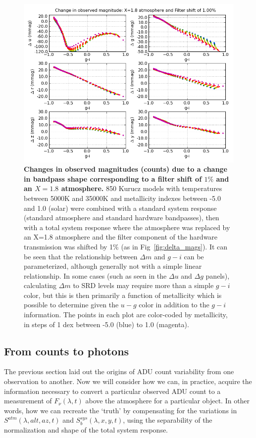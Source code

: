 \documentclass[12pt,preprint]{aastex}
\begin{document}
\begin{figure}[htbp]
\includegraphics[width=6in]{delta_mags2}
\caption{ {\small {\bf Changes in observed magnitudes (counts) due to
a change in bandpass shape corresponding to a filter shift of $1\%$
and an $X=1.8$ atmosphere.} 850 Kurucz models with temperatures
between 5000K and 35000K and metallicity indexes between -5.0 and 1.0
(solar) were combined with a standard system response (standard
atmosphere and standard hardware bandpasses), then with a total system
response where the atmosphere was replaced by an X=1.8 atmosphere and
the filter component of the hardware transmission was shifted by 1\%
(as in Fig~\ref{fig:delta_mags}).  It can be seen that the
relationship between $\Delta m$ and $g-i$ can be parameterized,
although generally not with a simple linear relationship. In some
cases (such as seen in the $\Delta u$ and $\Delta g$ panels),
calculating $\Delta m$ to SRD levels may require more than a simple
$g-i$ color, but this is then primarily a function of metallicity
which is possible to determine given the $u-g$ color in addition to
the $g-i$ information. The points in each plot are color-coded by
metallicity, in steps of 1 dex between -5.0 (blue) to 1.0 (magenta).}
\label{fig:delta_mags2} }
\end{figure}


\subsection{From counts to photons}
\label{sec:counts2photons}

The previous section laid out the origins of ADU count variability
from one observation to another. Now we will consider how we can, in
practice, acquire the information necessary to convert a particular
observed ADU count to a measurement of $F_\nu(\lambda,t)$ above the
atmosphere for a particular object.  In other words, how we can
recreate the `truth' by compensating for the variations in
$S^{atm}(\lambda,alt,az,t)$ and $S_b^{sys}(\lambda,x,y,t)$, using the
separability of the normalization and shape of the total system
response.
\end{document}
